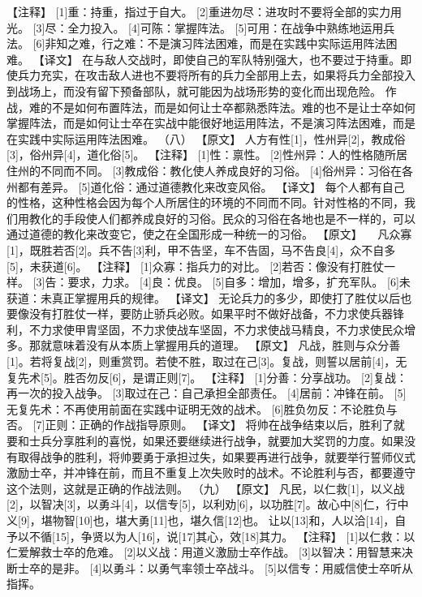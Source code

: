 \documentclass[a4paper,12pt,UTF8,twoside]{ctexbook}
\begin{document}
【注释】
[1]重：持重，指过于自大。
[2]重进勿尽：进攻时不要将全部的实力用光。
[3]尽：全力投入。
[4]可陈：掌握阵法。
[5]可用：在战争中熟练地运用兵法。
[6]非知之难，行之难：不是演习阵法困难，而是在实践中实际运用阵法困难。
【译文】
在与敌人交战时，即使自己的军队特别强大，也不要过于持重。即使兵力充实，在攻击敌人进也不要将所有的兵力全部用上去，如果将兵力全部投入到战场上，而没有留下预备部队，就可能因为战场形势的变化而出现危险。
作战，难的不是如何布置阵法，而是如何让士卒都熟悉阵法。难的也不是让士卒如何掌握阵法，而是如何让士卒在实战中能很好地运用阵法，不是演习阵法困难，而是在实践中实际运用阵法困难。
（八）
【原文】
人方有性[1]，性州异[2]，教成俗[3]，俗州异[4]，道化俗[5]。
【注释】
[1]性：禀性。
[2]性州异：人的性格随所居住州的不同而不同。
[3]教成俗：教化使人养成良好的习俗。
[4]俗州异：习俗在各州都有差异。
[5]道化俗：通过道德教化来改变风俗。
【译文】
每个人都有自己的性格，这种性格会因为每个人所居住的环境的不同而不同。针对性格的不同，我们用教化的手段使人们都养成良好的习俗。民众的习俗在各地也是不一样的，可以通过道德的教化来改变它，使之在全国形成一种统一的习俗。
【原文】
　凡众寡[1]，既胜若否[2]。兵不告[3]利，甲不告坚，车不告固，马不告良[4]，众不自多[5]，未获道[6]。
【注释】
[1]众寡：指兵力的对比。
[2]若否：像没有打胜仗一样。
[3]告：要求，力求。
[4]良：优良。
[5]自多：增加，增多，扩充军队。
[6]未获道：未真正掌握用兵的规律。
【译文】
无论兵力的多少，即使打了胜仗以后也要像没有打胜仗一样，要防止骄兵必败。如果平时不做好战备，不力求使兵器锋利，不力求使甲胄坚固，不力求使战车坚固，不力求使战马精良，不力求使民众增多。那就意味着没有从本质上掌握用兵的道理。
【原文】
凡战，胜则与众分善[1]。若将复战[2]，则重赏罚。若使不胜，取过在己[3]。复战，则誓以居前[4]，无复先术[5]。胜否勿反[6]，是谓正则[7]。
【注释】
[1]分善：分享战功。
[2]复战：再一次的投入战争。
[3]取过在己：自己承担全部责任。
[4]居前：冲锋在前。
[5]无复先术：不再使用前面在实践中证明无效的战术。
[6]胜负勿反：不论胜负与否。
[7]正则：正确的作战指导原则。
【译文】
将帅在战争结束以后，胜利了就要和士兵分享胜利的喜悦，如果还要继续进行战争，就要加大奖罚的力度。如果没有取得战争的胜利，将帅要勇于承担过失，如果要再进行战争，就要举行誓师仪式激励士卒，并冲锋在前，而且不重复上次失败时的战术。不论胜利与否，都要遵守这个法则，这就是正确的作战法则。
（九）
【原文】
凡民，以仁救[1]，以义战[2]，以智决[3]，以勇斗[4]，以信专[5]，以利劝[6]，以功胜[7]。故心中[8]仁，行中义[9]，堪物智[10]也，堪大勇[11]也，堪久信[12]也。
让以[13]和，人以洽[14]，自予以不循[15]，争贤以为人[16]，说[17]其心，效[18]其力。
【注释】
[1]以仁救：以仁爱解救士卒的危难。
[2]以义战：用道义激励士卒作战。
[3]以智决：用智慧来决断士卒的是非。
[4]以勇斗：以勇气率领士卒战斗。
[5]以信专：用威信使士卒听从指挥。
\end{document}
